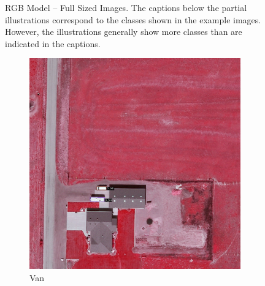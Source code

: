 \begin{figure}[h!]
    \caption[RGB Model – Full Sized Images]{RGB Model – Full Sized Images. The captions below the partial illustrations correspond to the classes shown in the example images. However, the illustrations generally show more classes than are indicated in the captions.}
    \label{fig:rgb_perm_exp_examples_fs}
\end{figure}



\begin{figure}[h!]
    \centering
    \begin{subfigure}[t]{0.38\textwidth}
        \centering
        \includegraphics[width=\linewidth]{images/015Results/02perm_exp/comp_images/irgb/198.png}
        \caption{Van}
    \end{subfigure}
    \begin{subfigure}[t]{0.38\textwidth}
        \centering

\end{subfigure}
\end{figure}
